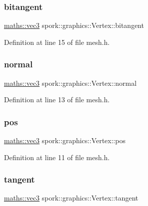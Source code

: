 \subsubsection{\texorpdfstring{bitangent}{bitangent}}
{\footnotesize\ttfamily \hyperlink{structspork_1_1maths_1_1vec3}{maths\+::vec3} spork\+::graphics\+::\+Vertex\+::bitangent}



Definition at line 15 of file mesh.\+h.

\mbox{\label{structspork_1_1graphics_1_1_vertex_a2cf54fd42944046bcd9ef0b5d465305f}} 
\subsubsection{\texorpdfstring{normal}{normal}}
{\footnotesize\ttfamily \hyperlink{structspork_1_1maths_1_1vec3}{maths\+::vec3} spork\+::graphics\+::\+Vertex\+::normal}



Definition at line 13 of file mesh.\+h.

\mbox{\label{structspork_1_1graphics_1_1_vertex_a575f427175d550b166c926bf10b5b91b}} 
\subsubsection{\texorpdfstring{pos}{pos}}
{\footnotesize\ttfamily \hyperlink{structspork_1_1maths_1_1vec3}{maths\+::vec3} spork\+::graphics\+::\+Vertex\+::pos}



Definition at line 11 of file mesh.\+h.

\mbox{\label{structspork_1_1graphics_1_1_vertex_a91af1dc87bf4b673d9744bc59a753e87}} 
\subsubsection{\texorpdfstring{tangent}{tangent}}
{\footnotesize\ttfamily \hyperlink{structspork_1_1maths_1_1vec3}{maths\+::vec3} spork\+::graphics\+::\+Vertex\+::tangent}



